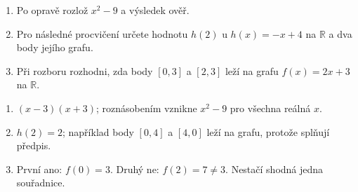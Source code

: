\documentclass[11pt,a4paper]{article}
\begin{document}
\begin{zadaniReseniBox}[title={Samostatná práce 1},breakable=false]
\begin{enumerate}[label=\alph*)]
\item Po opravě rozlož $x^2-9$ a výsledek ověř.
\item Pro následné procvičení určete hodnotu $h(2)$ u $h(x)=-x+4$ na $\mathbb R$ a dva body jejího grafu.
\item Při rozboru rozhodni, zda body $[0,3]$ a $[2,3]$ leží na grafu $f(x)=2x+3$ na $\mathbb R$.
\end{enumerate}
\tcblower
\begin{enumerate}[label=\alph*)]
\item $(x-3)(x+3)$; roznásobením vznikne $x^2-9$ pro všechna reálná $x$.
\item $h(2)=2$; například body $[0,4]$ a $[4,0]$ leží na grafu, protože splňují předpis.
\item První ano: $f(0)=3$. Druhý ne: $f(2)=7\ne3$. Nestačí shodná jedna souřadnice.
\end{enumerate}
\end{zadaniReseniBox}


\end{document}
